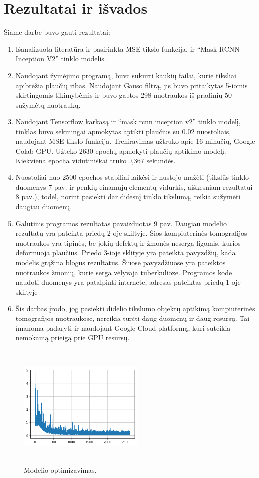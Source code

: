 \documentclass{VUMIFInfKursinis}
\begin{document}
\section{Rezultatai ir išvados}
\par
Šiame darbe buvo gauti rezultatai:
\begin{enumerate}
\item Išanalizuota literatūra ir pasirinkta MSE tikslo funkcija, ir \enquote{Mask RCNN Inception V2} tinklo modelis.
\item Naudojant žymėjimo programą, buvo sukurti kaukių
failai, kurie tiksliai apibrėžia plaučių ribas. Naudojant
Gauso filtrą, jis buvo pritaikytas 5-iomis skirtingomis tikimybėmis ir buvo gautos 298 nuotraukos iš pradinių 50 sužymėtų nuotraukų. 
\item Naudojant Tensorflow karkasą ir \enquote{mask rcnn inception v2} tinklo modelį, tinklas buvo sėkmingai
apmokytas aptikti plaučius su 0.02 nuostoliais, naudojant MSE tikslo funkcija. Treniravimas užtruko apie 16 minučių,
 Google Colab GPU. Užteko 2630 epochų apmokyti plaučių aptikimo modelį. Kiekviena epocha vidutiniškai truko 0,367 sekundės.
\item Nuostoliai nuo 2500 epochos stabiliai laikėsi ir nustojo mažėti (tikslūs tinklo duomenys 7 pav. ir penkių einamųjų elementų vidurkis, aiškesniam rezultatui 8 pav.), todėl, norint
pasiekti dar didesnį tinklo tikslumą, reikia sužymėti daugiau duomenų.
\item Galutinis programos rezultatas pavaizduotas 9 pav. Daugiau modelio rezultatų yra pateikta priedų 2-oje skiltyje. Šios kompiuterinės tomografijos nuotraukos yra tipinės, be jokių defektų ir žmonės neserga ligomis, kurios deformuoja plaučius. Priedo 3-ioje sklityje yra pateikta pavyzdžių, kada modelis grąžina blogus rezultatus. Šiuose pavyzdžiuose yra pateiktos nuotraukos žmonių, kurie serga vėlyvaja tuberkulioze. Programos kode naudoti
duomenys yra patalpinti internete, adresas pateiktas priedų 1-oje skiltyje
\item Šis darbas įrodo, jog pasiekti didelio tikslumo
objektų aptikimą kompiuterinės tomografijos nuotraukose, nereikia turėti daug duomenų ir daug
resursų. Tai įmanoma padaryti ir naudojant Google Cloud platformą, kuri suteikia
nemokamą prieigą prie GPU resursų.
\end{enumerate}

\begin{figure}[ht]
  \centering
  \includegraphics[width=6cm,height=6cm,keepaspectratio]{neislygintas.png}
  \caption{Modelio optimizavimas.}
  \label{fig:kaukė1}
\end{figure}
\end{document}
